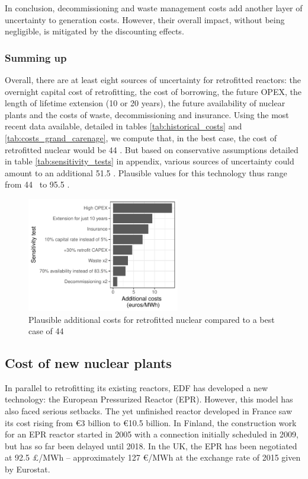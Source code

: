 In conclusion, decommissioning and waste management costs add another layer of uncertainty to generation costs. However, their overall impact, without being negligible, is mitigated by the discounting effects.


\subsubsection{Summing up}
Overall, there are at least eight sources of uncertainty for retrofitted reactors: the overnight capital cost of retrofitting, the cost of borrowing, the future OPEX, the length of lifetime extension (10 or 20 years), the future availability of nuclear plants and the costs of waste, decommissioning and insurance.
Using the most recent data available, detailed in tables \ref{tab:historical_costs} and \ref{tab:costs_grand_carenage}, we compute that, in the best case, the cost of retrofitted nuclear would be 44 \emwh. But based on conservative assumptions detailed in table \ref{tab:sensitivity_tests} in appendix, various sources of uncertainty could amount to an additional 51.5 \emwh. Plausible values for this technology thus range from 44 \emwh\ to 95.5 \emwh.


\begin{figure}[!ht]
	\centering
	\includegraphics[height=5cm]{figures/sensitivity_tests.pdf}
	\caption{Plausible additional costs for retrofitted nuclear compared to a best case of 44 \emwh}
	\label{fig:sensitivity_tests}
\end{figure}

\subsection{Cost of new nuclear plants}

In parallel to retrofitting its existing reactors, EDF has developed a new technology: the European Pressurized Reactor (EPR).
However, this model has also faced serious setbacks.
The yet unfinished reactor developed in France saw its cost rising from \euro 3 billion to \euro 10.5 billion.
In Finland, the construction work for an EPR reactor started in 2005 with a connection initially scheduled in 2009, but has so far been delayed until 2018.
In the UK, the EPR has been negotiated at 92.5 \pounds/MWh -- approximately 127 \euro/MWh at the exchange rate of 2015 given by Eurostat.

